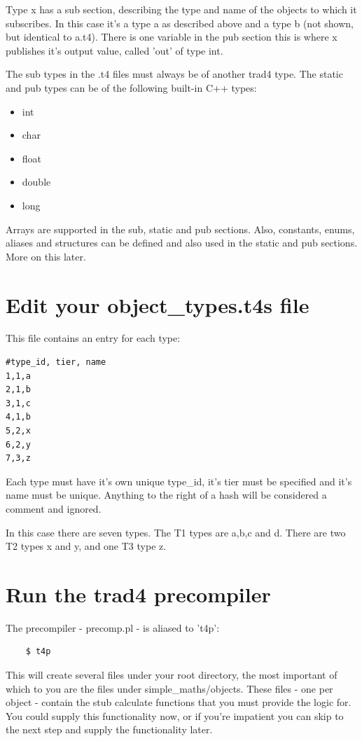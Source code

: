 \documentclass{report}
\begin{document}
Type x has a sub section, describing the type and name of the objects to which it subscribes. In this case it's a type a as described above and a type b (not shown, but identical to a.t4). There is one variable in the pub section this is where x publishes it's output value, called 'out' of type int.

The sub types in the .t4 files must always be of another trad4 type. The static and pub types can be of the following built-in C++ types:

\begin{itemize}
\item int
\item char
\item float
\item double
\item long
\end{itemize}

Arrays are supported in the sub, static and pub sections. Also, constants, enums, aliases and structures can be defined and also used in the static and pub sections. More on this later.

\section{Edit your object_types.t4s file}

This file contains an entry for each type:
\begin{verbatim}
#type_id, tier, name
1,1,a
2,1,b
3,1,c
4,1,b
5,2,x
6,2,y
7,3,z
\end{verbatim}

Each type must have it's own unique type_id, it's tier must be specified and it's name must be unique. 
Anything to the right of a hash will be considered a comment and ignored.

In this case there are seven types. The T1 types are a,b,c and d. There are two T2 types x and y, and one T3 type z.

\section{Run the trad4 precompiler}

The precompiler - precomp.pl - is aliased to 't4p':

\begin{verbatim}
    $ t4p
\end{verbatim}

This will create several files under your root directory, the most important of which to you are the files under simple_maths/objects. These files - one per object - contain the stub calculate functions that you must provide the logic for.  You could supply this functionality now, or if you're impatient you can skip to the next step and supply the functionality later.
\end{document}
